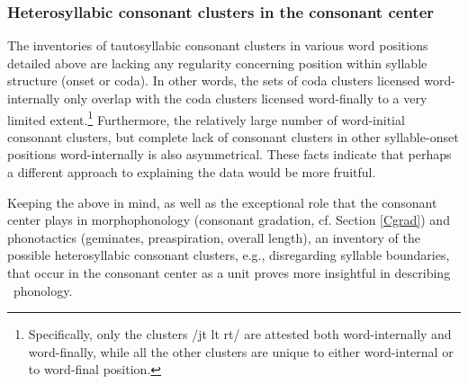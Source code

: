 \subsubsection[Heterosyllabic CCs in the consonant center]{Heterosyllabic consonant clusters in the consonant center}\label{consecutiveCs}
The inventories of tautosyllabic consonant clusters in various word positions detailed above are lacking any regularity concerning position within syllable structure (onset or coda). In other words, the sets of coda clusters licensed word-internally only overlap with the coda clusters licensed word-finally to a very limited extent.\footnote{Specifically, only the clusters /jt lt rt/ are attested both word-internally and word-finally, while all the other clusters are unique to either word-internal or to word-final position.} 
Furthermore, the relatively large number of word-initial consonant clusters, but complete lack of consonant clusters in other syllable-onset positions word-internally is also asymmetrical. 
These facts indicate that perhaps a different approach to explaining the data would be more fruitful. 

Keeping the above in mind, as well as the exceptional role that the consonant center plays in morphophonology (consonant gradation, cf. Section \ref{Cgrad}) and phonotactics (geminates, preaspiration, overall length), an inventory of the possible heterosyllabic consonant clusters, e.g., disregarding syllable boundaries, that occur in the consonant center as a unit proves more insightful in describing \PS\ phonology. 

